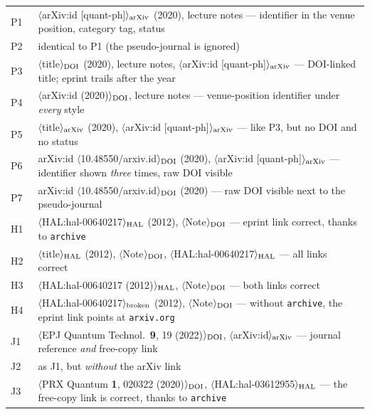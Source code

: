 \documentclass[onecolumn, amsmath, amssymb, aps, pra]{revtex4-2}
\begin{document}
\begin{center}
\begin{tabular}{lp{}}
\hline
P1~\cite{WilhelmStored} &
  $\langle$arXiv:id [quant-ph]$\rangle_{\rm arXiv}$ (2020), lecture
  notes --- identifier in the venue position, category tag, status \\
P2~\cite{WilhelmUnpublished} &
  identical to P1 (the pseudo-journal is ignored) \\
P3~\cite{WilhelmMisc} &
  $\langle$title$\rangle_{\rm DOI}$ (2020), lecture notes,
  $\langle$arXiv:id [quant-ph]$\rangle_{\rm arXiv}$
  --- DOI-linked title; eprint trails after the year \\
P4~\cite{WilhelmArticle} &
  $\langle$arXiv:id (2020)$\rangle_{\rm DOI}$, lecture notes
  --- venue-position identifier under \emph{every} style \\
P5~\cite{WilhelmArxivExport} &
  $\langle$title$\rangle_{\rm arXiv}$ (2020),
  $\langle$arXiv:id [quant-ph]$\rangle_{\rm arXiv}$
  --- like P3, but no DOI and no status \\
P6~\cite{WilhelmLegacyArticle} &
  arXiv:id $\langle$10.48550/arxiv.id$\rangle_{\rm DOI}$ (2020),
  $\langle$arXiv:id [quant-ph]$\rangle_{\rm arXiv}$
  --- identifier shown \emph{three} times, raw DOI visible \\
P7~\cite{WilhelmArticleDoi} &
  arXiv:id $\langle$10.48550/arxiv.id$\rangle_{\rm DOI}$ (2020)
  --- raw DOI visible next to the pseudo-journal \\
\hline
H1~\cite{TuriniciUnpublished} &
  $\langle$HAL:hal-00640217$\rangle_{\rm HAL}$ (2012),
  $\langle$Note$\rangle_{\rm DOI}$ --- eprint link correct,
  thanks to \texttt{archive} \\
H2~\cite{TuriniciMisc} &
  $\langle$title$\rangle_{\rm HAL}$ (2012), $\langle$Note$\rangle_{\rm DOI}$,
  $\langle$HAL:hal-00640217$\rangle_{\rm HAL}$
  --- all links correct \\
H3~\cite{TuriniciArticle} &
  $\langle$HAL:hal-00640217 (2012)$\rangle_{\rm HAL}$,
  $\langle$Note$\rangle_{\rm DOI}$ --- both links correct \\
H4~\cite{TuriniciNoArchive} &
  $\langle$HAL:hal-00640217$\rangle_{\rm broken}$ (2012),
  $\langle$Note$\rangle_{\rm DOI}$ --- without
  \texttt{archive}, the eprint link points at \texttt{arxiv.org} \\
\hline
J1~\cite{KochFull} &
  $\langle$EPJ Quantum Technol.\ \textbf{9}, 19
  (2022)$\rangle_{\rm DOI}$, $\langle$arXiv:id$\rangle_{\rm arXiv}$
  --- journal reference \emph{and} free-copy link \\
J2~\cite{KochNoEprint} &
  as J1, but \emph{without} the arXiv link \\
J3~\cite{SauvagePRXQ} &
  $\langle$PRX Quantum \textbf{1}, 020322 (2020)$\rangle_{\rm DOI}$,
  $\langle$HAL:hal-03612955$\rangle_{\rm HAL}$
  --- the free-copy link is correct, thanks to \texttt{archive} \\
\hline
\end{tabular}
\end{center}
\end{document}

